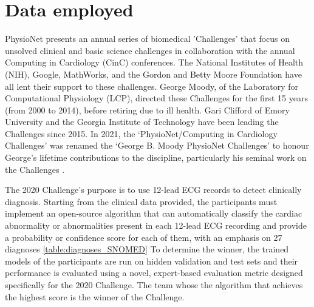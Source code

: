 \section{Data employed} \label{5dataset}


PhysioNet presents an annual series of biomedical 'Challenges' that focus on unsolved clinical and basic science challenges in collaboration with the annual Computing in Cardiology (CinC) conferences. The National Institutes of Health (NIH), Google, MathWorks, and the Gordon and Betty Moore Foundation have all lent their support to these challenges. George Moody, of the Laboratory for Computational Physiology (LCP), directed these Challenges for the first 15 years (from 2000 to 2014), before retiring due to ill health. Gari Clifford of Emory University and the Georgia Institute of Technology have been leading the Challenges since 2015. In 2021, the ‘PhysioNet/Computing in Cardiology Challenges’ was renamed the ‘George B. Moody PhysioNet Challenges’ to honour George's lifetime contributions to the discipline, particularly his seminal work on the Challenges \cite{dataset1}.

The 2020 Challenge's purpose is to use 12-lead ECG records to detect clinically diagnosis. Starting from the clinical data provided, the participants must implement an open-source algorithm that can automatically classify the
cardiac abnormality or abnormalities present in each 12-lead ECG recording
and provide a probability or confidence score for each of them, with an
emphasis on 27 diagnoses \ref{table:diagnoses_SNOMED} To determine the winner, the trained
models of the participants are run on hidden validation and test sets and
their performance is evaluated using a novel, expert-based evaluation
metric designed specifically for the 2020 Challenge. The team whose
the algorithm that achieves the highest score is the winner of the Challenge.

\newpage 


